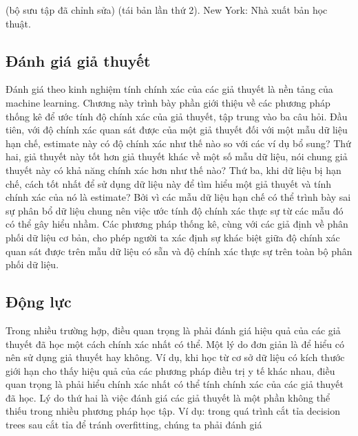 (bộ sưu tập đã chỉnh sửa) (tái bản lần thứ 2). New York: Nhà xuất bản học thuật.

\subsection{Đánh giá giả thuyết}

Đánh giá theo kinh nghiệm tính chính xác của các giả thuyết là nền tảng của machine learning. Chương này trình bày phần giới thiệu về các phương pháp thống kê để ước tính độ chính xác của giả thuyết, tập trung vào ba câu hỏi. Đầu tiên, với độ chính xác quan sát được của một giả thuyết đối với một mẫu dữ liệu hạn chế, estimate này có độ chính xác như thế nào so với các ví dụ bổ sung? Thứ hai, giả thuyết này tốt hơn giả thuyết khác về một số mẫu dữ liệu, nói chung giả thuyết này có khả năng chính xác hơn như thế nào? Thứ ba, khi dữ liệu bị hạn chế, cách tốt nhất để sử dụng dữ liệu này để tìm hiểu một giả thuyết và tính chính xác của nó là estimate? Bởi vì các mẫu dữ liệu hạn chế có thể trình bày sai sự phân bổ dữ liệu chung nên việc ước tính độ chính xác thực sự từ các mẫu đó có thể gây hiểu nhầm. Các phương pháp thống kê, cùng với các giả định về phân phối dữ liệu cơ bản, cho phép người ta xác định sự khác biệt giữa độ chính xác quan sát được trên mẫu dữ liệu có sẵn và độ chính xác thực sự trên toàn bộ phân phối dữ liệu.

\subsection{Động lực}

Trong nhiều trường hợp, điều quan trọng là phải đánh giá hiệu quả của các giả thuyết đã học một cách chính xác nhất có thể. Một lý do đơn giản là để hiểu có nên sử dụng giả thuyết hay không. Ví dụ, khi học từ cơ sở dữ liệu có kích thước giới hạn cho thấy hiệu quả của các phương pháp điều trị y tế khác nhau, điều quan trọng là phải hiểu chính xác nhất có thể tính chính xác của các giả thuyết đã học. Lý do thứ hai là việc đánh giá các giả thuyết là một phần không thể thiếu trong nhiều phương pháp học tập. Ví dụ: trong quá trình cắt tỉa decision trees sau cắt tỉa để tránh overfitting, chúng ta phải đánh giá


